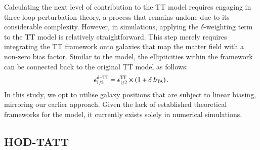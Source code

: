 Calculating the next level of contribution to the TT model requires engaging in three-loop perturbation theory, a process that remains undone due to its considerable complexity.
However, in simulations, applying the $\delta$-weighting term to the TT model is relatively straightforward.
This step merely requires integrating the TT framework onto galaxies that map the matter field with a non-zero bias factor. 
Similar to the \dNLA model, the ellipticities within the \dTT framework can be connected back to the original TT model as follows:
\begin{eqnarray}
\epsilon_{1/2}^{\delta-\rm TT} = \epsilon_{1/2}^{\rm TT}\times(1 + \delta \: b_{\rm TA}) \, .
\label{eq:tidal_th_deltaTT}
\end{eqnarray}
In this study, we opt to utilise galaxy positions that are subject to linear biasing, mirroring our earlier approach.
Given the lack of established theoretical frameworks for the \dTT model, it currently exists solely in numerical simulations.

 
\subsection{HOD-TATT}
\label{subsec:HOD-TATT}


